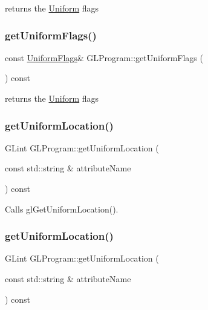 returns the \hyperlink{structUniform}{Uniform} flags \mbox{\label{classGLProgram_a809306485fbc3534053138ec531dbc97}} 
\subsubsection{\texorpdfstring{get\+Uniform\+Flags()}{getUniformFlags()}\hspace{0.1cm}{\footnotesize\ttfamily [2/2]}}
{\footnotesize\ttfamily const \hyperlink{structGLProgram_1_1UniformFlags}{Uniform\+Flags}\& G\+L\+Program\+::get\+Uniform\+Flags (\begin{DoxyParamCaption}{ }\end{DoxyParamCaption}) const\hspace{0.3cm}{\ttfamily [inline]}}

returns the \hyperlink{structUniform}{Uniform} flags \mbox{\label{classGLProgram_a36c4bb72ceff2951794c8b0b52ed9ef1}} 
\subsubsection{\texorpdfstring{get\+Uniform\+Location()}{getUniformLocation()}\hspace{0.1cm}{\footnotesize\ttfamily [1/2]}}
{\footnotesize\ttfamily G\+Lint G\+L\+Program\+::get\+Uniform\+Location (\begin{DoxyParamCaption}\item[{const std\+::string \&}]{attribute\+Name }\end{DoxyParamCaption}) const}

Calls gl\+Get\+Uniform\+Location(). \mbox{\label{classGLProgram_a36c4bb72ceff2951794c8b0b52ed9ef1}} 
\subsubsection{\texorpdfstring{get\+Uniform\+Location()}{getUniformLocation()}\hspace{0.1cm}{\footnotesize\ttfamily [2/2]}}
{\footnotesize\ttfamily G\+Lint G\+L\+Program\+::get\+Uniform\+Location (\begin{DoxyParamCaption}\item[{const std\+::string \&}]{attribute\+Name }\end{DoxyParamCaption}) const}

